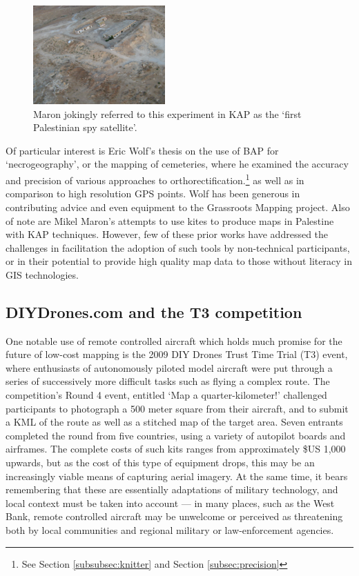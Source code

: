 \documentclass[11pt,oneside,notitlepage]{report}
\begin{document}
\begin{figure}
	\begin{flushright}
		\includegraphics[width=0.45\textwidth]{images/maron-spy-satellite.jpg}
		\caption{Maron jokingly referred to this experiment in \ac{KAP} as the `first Palestinian spy satellite'. \cite{maron2008former}}
	\end{flushright}
\end{figure}

Of particular interest is Eric Wolf's thesis on the use of \ac{BAP} for `necrogeography', or the mapping of cemeteries, where he examined the accuracy and precision of various approaches to orthorectification.\footnote{See Section \ref{subsubsec:knitter} and Section \ref{subsec:precision}} as well as in comparison to high resolution GPS points. Wolf has been generous in contributing advice and even equipment to the Grassroots Mapping project. Also of note are Mikel Maron's attempts to use kites to produce maps in Palestine \cite{maron2008former} with \ac{KAP} techniques. However, few of these prior works have addressed the challenges in facilitation the adoption of such tools by non-technical participants, or in their potential to provide high quality map data to those without literacy in GIS technologies.  

\subsection{DIYDrones.com and the T3 competition}

One notable use of remote controlled aircraft which holds much promise for the future of low-cost mapping is the 2009 DIY Drones Trust Time Trial (T3) event, where enthusiasts of autonomously piloted model aircraft were put through a series of successively more difficult tasks such as flying a complex route. The competition's Round 4 event, entitled `Map a quarter-kilometer!' challenged participants to photograph a 500 meter square from their aircraft, and to submit a KML of the route as well as a stitched map of the target area. Seven entrants completed the round from five countries, using a variety of autopilot boards and airframes. \cite{anderson2010winners} The complete costs of such kits ranges from approximately \$US 1,000 upwards, but as the cost of this type of equipment drops, this may be an increasingly viable means of capturing aerial imagery. At the same time, it bears remembering that these are essentially adaptations of military technology, and local context must be taken into account --- in many places, such as the West Bank, remote controlled aircraft may be unwelcome or perceived as threatening both by local communities and regional military or law-enforcement agencies. 
\end{document}

